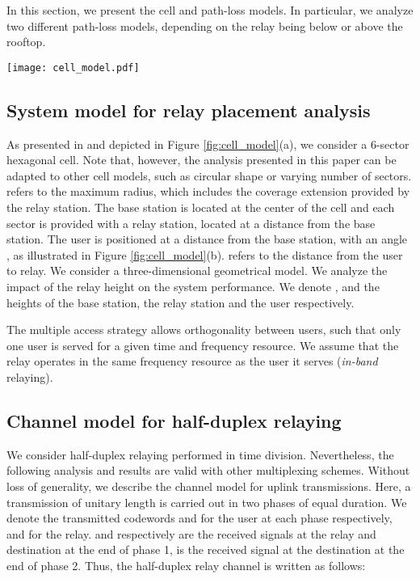 \documentclass[journal]{IEEEtran}
\theoremstyle{definition}
\begin{document}
In this section, we present the cell and path-loss models. In particular, we analyze two different path-loss models, depending on the relay being below or above the rooftop. 


\begin{figure*}
\centering \texttt{[image: cell\_model.pdf]}
\vspace*{10pt}
\caption{System model for a 6-sector urban cell}
\label{fig:cell_model}
\end{figure*}


\subsection{System model for relay placement analysis}

As presented in \cite{Peters2009} and depicted in Figure \ref{fig:cell_model}(a), we consider a 6-sector hexagonal cell. Note that, however, the analysis presented in this paper can be adapted to other cell models, such as circular shape or varying number of sectors. 
  refers to the maximum radius, which includes the coverage extension provided by the relay station. 
The base station is located at the center of the cell and each sector is provided with a relay station, located at a distance  from the base station.
The user is positioned at a distance  from the base station, with an angle , as illustrated in Figure \ref{fig:cell_model}(b).  refers to the distance from the user to relay.
We consider a three-dimensional geometrical model. We analyze the impact of the relay height on the system performance. We denote ,  and  the heights of the base station, the relay station and the user respectively. 

The multiple access strategy allows orthogonality between users, such that only one user is served for a given time and frequency resource.
We assume that the relay operates in the same frequency resource as the user it serves (\textit{in-band} relaying).


\subsection{Channel model for half-duplex relaying}

We consider half-duplex relaying performed in time division.
Nevertheless, the following analysis and results are valid with other multiplexing schemes. Without loss of generality, we describe the channel model for uplink transmissions.
Here, a transmission of unitary length is carried out in two phases of equal duration. We denote the transmitted codewords  and  for the user at each phase respectively, and  for the relay.  and  respectively are the received signals at the relay and destination at the end of phase 1,  is the received signal at the destination at the end of phase 2. Thus, the half-duplex relay channel is written as follows:
\end{document}
